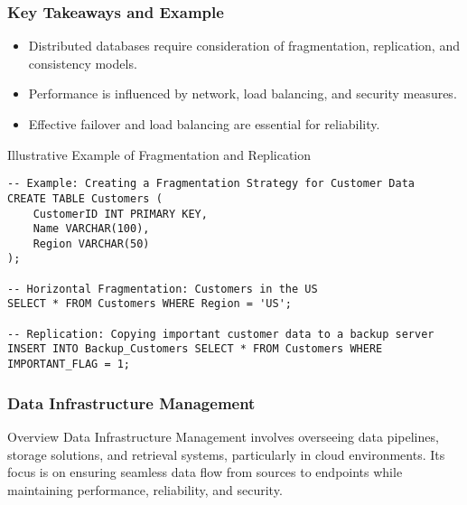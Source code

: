\documentclass[aspectratio=169]{beamer}
\begin{document}
\begin{frame}[fragile]
    \frametitle{Key Takeaways and Example}
    \begin{itemize}
        \item Distributed databases require consideration of fragmentation, replication, and consistency models.
        \item Performance is influenced by network, load balancing, and security measures.
        \item Effective failover and load balancing are essential for reliability.
    \end{itemize}
   
    \begin{block}{Illustrative Example of Fragmentation and Replication}
        \begin{lstlisting}
-- Example: Creating a Fragmentation Strategy for Customer Data
CREATE TABLE Customers (
    CustomerID INT PRIMARY KEY,
    Name VARCHAR(100),
    Region VARCHAR(50)
);

-- Horizontal Fragmentation: Customers in the US
SELECT * FROM Customers WHERE Region = 'US';

-- Replication: Copying important customer data to a backup server
INSERT INTO Backup_Customers SELECT * FROM Customers WHERE IMPORTANT_FLAG = 1;
        \end{lstlisting}
    \end{block}
\end{frame}

\begin{frame}[fragile]
  \frametitle{Data Infrastructure Management}
  \begin{block}{Overview}
    Data Infrastructure Management involves overseeing data pipelines, storage solutions, and retrieval systems, particularly in cloud environments. 
    Its focus is on ensuring seamless data flow from sources to endpoints while maintaining performance, reliability, and security.
  \end{block}
\end{frame}
\end{document}
